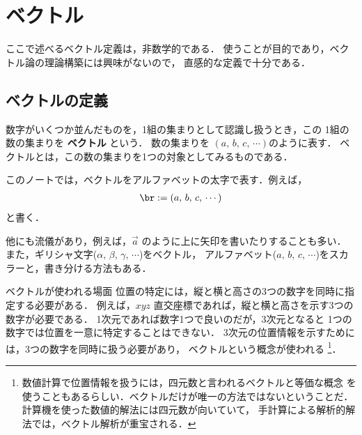 ﻿%

    \section{ベクトル}
        \begin{mycomment}
        ここで述べるベクトル定義は，非数学的である．
        使うことが目的であり，ベクトル論の理論構築には興味がないので，
        直感的な定義で十分である．
        \end{mycomment}

                \subsection{ベクトルの定義}
        数字がいくつか並んだものを，1組の集まりとして認識し扱うとき，この
        1組の数の集まりを \textbf{ベクトル} という．
        数の集まりを $(a,\,b,\,c,\,\cdots)$のように表す．
        ベクトルとは，この数の集まりを1つの対象としてみるものである．

        このノートでは，ベクトルをアルファベットの太字で表す．例えば，
        \begin{align}
            \br := (a,\,b,\,c,\,\cdots)
        \end{align}
        と書く．

        他にも流儀があり，例えば，$\vec{a}$ のように上に矢印を書いたりすることも多い．
        また，ギリシャ文字($\alpha,\,\beta,\,\gamma,\,\cdots$)をベクトル，
        アルファベット($a,\,b,\,c,\,\cdots$)をスカラーと，書き分ける方法もある．

        \begin{memo}{ベクトルが使われる場面}
        位置の特定には，縦と横と高さの3つの数字を同時に指定する必要がある．
        例えば，$xyz$ 直交座標であれば，縦と横と高さを示す3つの数字が必要である．
        1次元であれば数字1つで良いのだが，3次元となると
        1つの数字では位置を一意に特定することはできない．
        3次元の位置情報を示すためには，3つの数字を同時に扱う必要があり，
        ベクトルという概念が使われる
            \footnote{
                数値計算で位置情報を扱うには，四元数と言われるベクトルと等価な概念
                を使うこともあるらしい．ベクトルだけが唯一の方法ではないということだ．
                計算機を使った数値的解法には四元数が向いていて，
                手計算による解析的解法では，ベクトル解析が重宝される．
            }．
        \end{memo}

